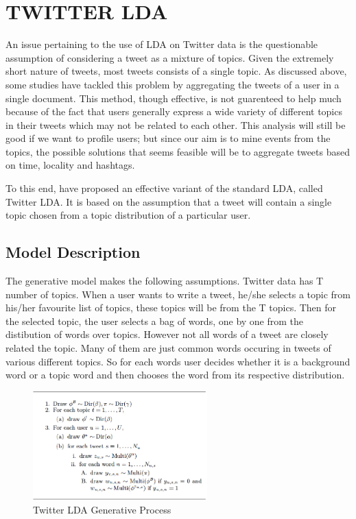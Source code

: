 
\section{\uppercase{Twitter LDA}}
An issue pertaining to the use of LDA on Twitter data is the questionable assumption of considering a tweet as a mixture of topics. Given the extremely short nature of tweets, most tweets consists of a single topic. As discussed above, some studies have tackled this problem by aggregating the tweets of a user in a single document. This method, though effective, is not guarenteed to help much because of the fact that users generally express a wide variety of different topics in their tweets which may not be related to each other. This analysis will still be good if we want to profile users; but since our aim is to mine events from the topics, the possible solutions that seems feasible will be to aggregate tweets based on time, locality and hashtags.

To this end, \cite{zhao2011comparing} have proposed an effective variant of the standard LDA, called Twitter LDA. It is based on the assumption that a tweet will contain a single topic chosen from a topic distribution of a particular user. 

\subsection{Model Description} 
The generative model makes the following assumptions. Twitter data has T number of topics. When a user wants to write a tweet, he/she selects a topic from his/her favourite list of topics, these topics will be from the T topics. Then for the selected topic, the user selects a bag of words, one by one from the distibution of words over topics. However not all words of a tweet are closely related the topic. Many of them are just common words occuring in tweets of various different topics. So for each words user decides whether it is a background word or a topic word and then chooses the word from its respective distribution.
 \begin{figure}
 \centering
 \includegraphics[width=0.6\textwidth]{figures/lda-algo}
 \caption{Twitter LDA Generative Process}
 \label{fig:twitterlda-algo}
\end{figure}

